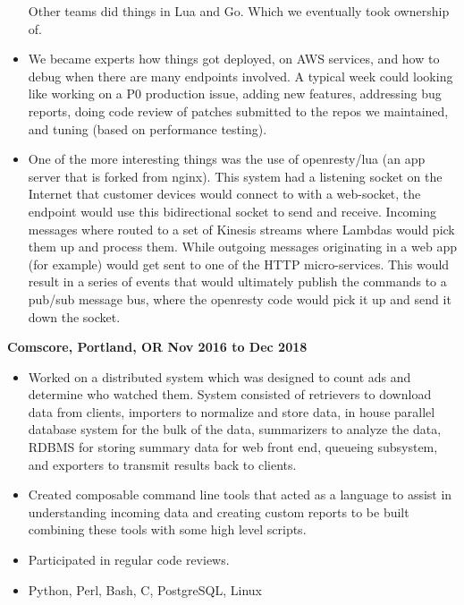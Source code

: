 \documentclass{res}
\begin{document}
\begin{resume}
\begin{itemize}
Other teams did things in Lua and Go. Which we eventually took ownership
of.

  \item
We became experts how things got deployed, on AWS services, and how to
debug when there are many endpoints involved.  A typical week could
looking like working on a P0 production issue, adding new features,
addressing bug reports, doing code review of patches submitted to the
repos we maintained, and tuning (based on performance testing).

  \item
One of the more interesting things was the use of openresty/lua (an app server
that is forked from nginx).  This system had a listening socket on the
Internet that customer devices would connect to with a web-socket, the endpoint
would use this bidirectional socket to send and receive.  Incoming messages
where routed to a set of Kinesis streams where Lambdas would pick them up and
process them.  While outgoing messages originating in a web app (for
example) would get sent to one of  the HTTP micro-services.  This would result
in a series of events that would ultimately publish the commands to a pub/sub
message bus, where the openresty code would pick it up and send it down the socket.
  \end{itemize}

  {\large \bf Comscore, Portland, OR \hfill Nov 2016 to Dec 2018}
  \begin{itemize}

  \item
    Worked on a distributed system which was designed to count ads and
    determine who watched them.  System consisted of retrievers to download
    data from clients, importers to normalize and store data, in house
    parallel database system for the bulk of the data, summarizers to
    analyze the data, RDBMS for storing summary data for
    web front end, queueing subsystem, and exporters to transmit
    results back to clients.

  \item
    Created composable command line tools that acted as a language to
    assist in understanding incoming data and creating custom reports to
    be built combining these tools with some high level scripts.

  \item
    Participated in regular code reviews.

  \item

    Python, Perl, Bash, C, PostgreSQL, Linux


\end{itemize}
\end{resume}
\end{document}
